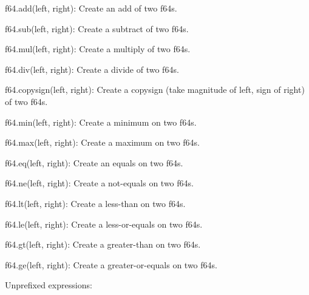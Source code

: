 \begin{DoxyItemize}
\begin{DoxyItemize}
\item {\ttfamily f64.\+add(left, right)}\+: Create an add of two {\ttfamily f64}s.
\item {\ttfamily f64.\+sub(left, right)}\+: Create a subtract of two {\ttfamily f64}s.
\item {\ttfamily f64.\+mul(left, right)}\+: Create a multiply of two {\ttfamily f64}s.
\item {\ttfamily f64.\+div(left, right)}\+: Create a divide of two {\ttfamily f64}s.
\item {\ttfamily f64.\+copysign(left, right)}\+: Create a copysign (take magnitude of left, sign of right) of two {\ttfamily f64}s.
\item {\ttfamily f64.\+min(left, right)}\+: Create a minimum on two {\ttfamily f64}s.
\item {\ttfamily f64.\+max(left, right)}\+: Create a maximum on two {\ttfamily f64}s.
\item {\ttfamily f64.\+eq(left, right)}\+: Create an equals on two {\ttfamily f64}s.
\item {\ttfamily f64.\+ne(left, right)}\+: Create a not-\/equals on two {\ttfamily f64}s.
\item {\ttfamily f64.\+lt(left, right)}\+: Create a less-\/than on two {\ttfamily f64}s.
\item {\ttfamily f64.\+le(left, right)}\+: Create a less-\/or-\/equals on two {\ttfamily f64}s.
\item {\ttfamily f64.\+gt(left, right)}\+: Create a greater-\/than on two {\ttfamily f64}s.
\item {\ttfamily f64.\+ge(left, right)}\+: Create a greater-\/or-\/equals on two {\ttfamily f64}s.
\end{DoxyItemize}
\end{DoxyItemize}

Unprefixed expressions\+:


